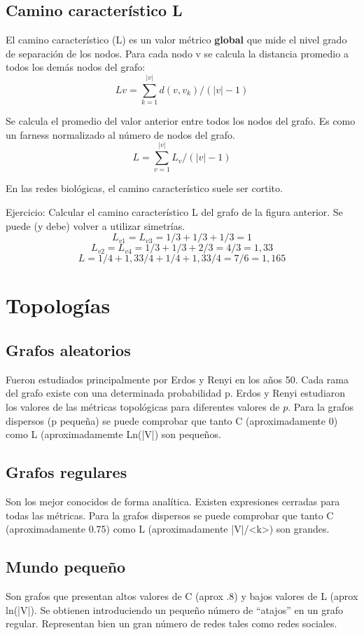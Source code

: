 \subsection{Camino característico L}
El camino característico (L) es un valor métrico \textbf{global} que mide el nivel grado de separación de los nodos. Para cada nodo v se calcula la distancia promedio a todos los demás nodos del grafo:
$$Lv = \sum^{|v|}_{k=1} d(v, v_k) / (|v| - 1)$$

Se calcula el promedio del valor anterior entre todos los nodos del grafo. Es como un farness normalizado al número de nodos del grafo.
$$L = \sum^{|v|}_{v=1} L_v / (|v| - 1)$$

En las redes biológicas, el camino característico suele ser cortito. 

Ejercicio: Calcular el camino característico L del grafo de la figura anterior. Se puede (y debe) volver a utilizar simetrías. 
$$L_{v1} = L_{v3} = 1/3 + 1/3 + 1/3 = 1$$
$$L_{v2} = L_{v4} = 1/3 + 1/3 + 2/3 = 4/3 = 1,33$$
$$L = 1/4 + 1,33/4 + 1/4 + 1,33/4 = 7/6 = 1,165$$

\section{Topologías}
\subsection{Grafos aleatorios}
Fueron estudiados principalmente por Erdos y Renyi en los años 50. Cada rama del grafo existe con una determinada probabilidad p. Erdos y Renyi estudiaron los valores de las métricas topológicas para diferentes valores de $p$. Para la grafos dispersos (p pequeña) se puede comprobar que tanto C (aproximadamente 0) como L (aproximadamemte Ln(|V|) son pequeños.

\subsection{Grafos regulares}
Son los mejor conocidos de forma analítica. Existen expresiones cerradas para todas las métricas. Para la grafos dispersos se puede comprobar que tanto C (aproximadamente 0.75) como L (aproximadamente |V|/<k>) son grandes. 

\subsection{Mundo pequeño}
Son grafos que presentan altos valores de C (aprox .8) y bajos valores de L (aprox ln(|V|). Se obtienen introduciendo un pequeño número de “atajos” en un grafo regular. Representan bien un gran número de redes tales como redes sociales.


